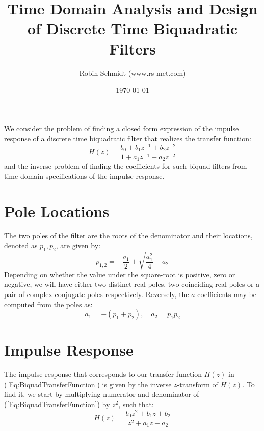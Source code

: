 \title{Time Domain Analysis and Design of Discrete Time Biquadratic Filters}
\author{Robin Schmidt (www.rs-met.com)}
\date{\today}
\maketitle

We consider the problem of finding a closed form expression of the impulse response of a discrete time biquadratic filter that realizes the transfer function:
\begin{equation}
\label{Eq:BiquadTransferFunction}
 H(z) = \frac{b_0 + b_1 z^{-1} + b_2 z^{-2}} {1 + a_1 z^{-1} + a_2 z^{-2}}
\end{equation}
and the inverse problem of finding the coefficients for such biquad filters from time-domain specifications of the impulse response.

\section{Pole Locations}
The two poles of the filter are the roots of the denominator and their locations, denoted as $p_1, p_2$, are given by:
\begin{equation}
\label{Eq:PoleLocations}
\boxed
{
 p_{1,2} = -\frac{a_1}{2} \pm \sqrt{\frac{a_1^2}{4} - a_2}
}
\end{equation}
Depending on whether the value under the square-root is positive, zero or negative, we will have either two distinct real poles, two coinciding real poles or a pair of complex conjugate poles respectively. Reversely, the $a$-coefficients may be computed from the poles as:
\begin{equation}
\label{Eq:CoeffsFromPoles}
\boxed
{
 a_1 = -(p_1 + p_2), \quad a_2 = p_1 p_2
}
\end{equation}


\section{Impulse Response}
The impulse response that corresponds to our transfer function $H(z)$ in (\ref{Eq:BiquadTransferFunction}) is given by the inverse $z$-transform of $H(z)$. To find it, we start by multiplying numerator and denominator of (\ref{Eq:BiquadTransferFunction}) by $z^2$, such that:
\begin{equation}
 H(z) = \frac{b_0 z^2 + b_1 z + b_2} {z^2 + a_1 z + a_2}
\end{equation}

